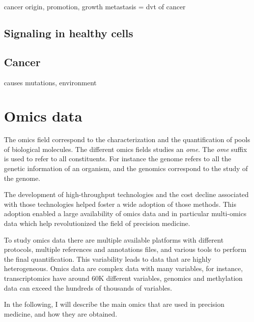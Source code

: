 \documentclass[../main.tex]{subfiles}
\begin{document}
 cancer origin, promotion, growth metastasis = dvt of cancer
 \subsection{Signaling in healthy cells}
 \subsection{Cancer}
     causes mutations, environment


\section{Omics data}
 The omics field correspond to the characterization and the quantification of pools of biological molecules.
 The different omics fields studies an \textit{ome}.
 The \textit{ome} suffix is used to refer to all constituents.
 For instance the genome refers to all the genetic information of an organism, and the genomics correspond to the study of the genome.

 The development of high-throughput technologies and the cost decline associated with those technologies helped foster a wide adoption of those methods.
 This adoption enabled a large availability of omics data and in particular multi-omics data which help revolutionized the field of precision medicine.

 To study omics data there are multiple available platforms with different protocols, multiple references and annotations files, and various tools to perform the final quantification.
 This variability leads to data that are highly heterogeneous.
 Omics data are complex data with many variables, for instance, transcriptomics have around 60K different variables, genomics and methylation data can exceed the hundreds of thousands of variables.

 In the following, I will describe the main omics that are used in precision medicine, and how they are obtained.
\end{document}
